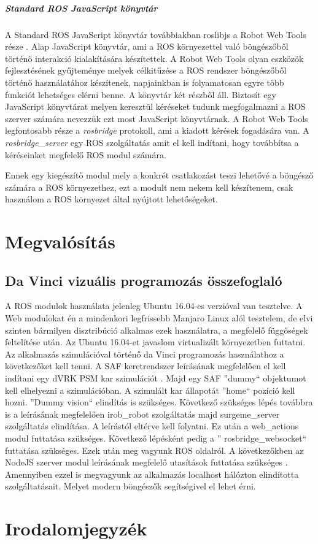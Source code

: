 \documentclass[12pt,a4paper,oneside]{report} %
\begin{document}
\paragraph{Standard ROS JavaScript könyvtár}
\label{roslibjs}
A Standard ROS JavaScript könyvtár továbbiakban roslibjs a Robot Web Tools része \cite{toris2015robot}.  Alap JavaScript könyvtár, ami a ROS környezettel való böngészőből történő interakció kialakítására készítettek. A Robot Web Tools olyan eszközök fejlesztésének gyűjteménye melyek célkitűzése a ROS rendszer böngészőből történő használatához készítenek, napjainkban is folyamatosan egyre több funkciót lehetséges elérni benne. A könyvtár két részből áll. Biztosít egy JavaScript könyvtárat melyen keresztül kéréseket tudunk megfogalmazni a ROS szerver számára nevezzük ezt most JavaScript könyvtárnak. A Robot Web Tools legfontosabb része a \textit{rosbridge} protokoll, ami a kiadott kérések fogadására van. A \textit{rosbridge\_server} egy ROS szolgáltatás amit el kell indítani, hogy továbbítsa a kéréseinket megfelelő ROS modul számára.

Ennek egy kiegészítő modul mely a konkrét csatlakozást teszi lehetővé a böngésző számára a ROS környezethez, ezt a modult nem nekem kell készítenem, csak használom a ROS környezet által nyújtott lehetőségeket.

\chapter{Megvalósítás}
\section{Da Vinci vizuális programozás összefoglaló}
A ROS modulok használata jelenleg Ubuntu 16.04-es verzióval van tesztelve. A Web modulokat én a mindenkori legfrissebb Manjaro Linux alól tesztelem, de elvi szinten bármilyen disztribúció alkalmas ezek használatra, a megfelelő függőségek feltelítése után. Az Ubuntu 16.04-et javaslom virtualizált környezetben futtatni.
Az alkalmazás szimulációval történő  da Vinci programozás használathoz a következőket kell tenni. A SAF keretrendszer leírásának megfelelően  el kell indítani egy dVRK PSM kar szimulációt \cite{irobotics2020May}. Majd egy SAF ''dummy`` objektumot kell elhelyezni a szimulációban. A szimulált kar állapotát ''home`` pozíció kell hozni. ''Dummy vision`` elindítás is szükséges. Következő szükséges lépés továbbra is a leírásának megfelelően irob\_robot szolgáltatás majd surgeme\_server szolgáltatás elindítása. A leírástól eltérve kell folyatni. Ez után a web\_actions modul futtatása szükséges. Következő lépésként pedig a '' rosbridge\_websocket`` futtatása szükséges. Ezek után meg vagyunk ROS oldalról. A következőkben az NodeJS szerver modul leírásának megfelelő utasítások futtatása szükséges \cite{aaronrancsik2020May}. Amennyiben ezzel is megvagyunk az alkalmazás localhost hálózton elindította szolgáltatásait. Melyet modern böngészők segítségivel el lehet érni.
\chapter*{Irodalomjegyzék}
\printbibliography[heading=none]
\newpage
\listoffigures
{}
\end{document}
